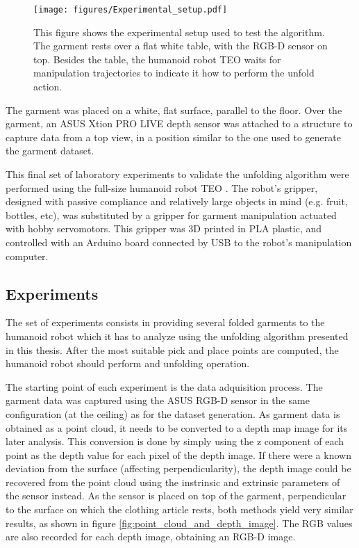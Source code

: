 \begin{figure}[htbp]
    \centering
    \texttt{[image: figures/Experimental\_setup.pdf]}
    \caption[Experimental setup used to test the algorithm]
    {This figure shows the experimental setup used to test the algorithm. The garment rests over a flat white table, with the RGB-D sensor on top. Besides the table, the humanoid robot TEO waits for manipulation trajectories to indicate it how to perform the unfold action.}
    \label{fig:experimental_setup}
\end{figure}

The garment was placed on a white, flat surface, parallel to the floor. Over the garment, an ASUS Xtion PRO LIVE depth sensor was attached to a structure to capture data from a top view, in a position similar to the one used to generate the garment dataset.

This final set of laboratory experiments to validate the unfolding algorithm were performed using the full-size humanoid robot TEO \cite{martinez2012teo}. The robot's gripper, designed with passive compliance and relatively large objects in mind (e.g. fruit, bottles, etc), was substituted by a gripper for garment manipulation actuated with hobby servomotors. This gripper was 3D printed in PLA plastic, and controlled with an Arduino board connected by USB to the robot's manipulation computer. 


\subsection{Experiments}
\label{experiments:experiments}
The set of experiments consists in providing several folded garments to the humanoid robot which it has to analyze using the unfolding algorithm presented in this thesis. After the most suitable pick and place points are computed, the humanoid robot should perform and unfolding operation.

The starting point of each experiment is the data adquisition process. The garment data was captured using the ASUS RGB-D sensor in the same configuration (at the ceiling) as for the dataset generation. As garment data is obtained as a point cloud, it needs to be converted to a depth map image for its later analysis. This conversion is done by simply using the z component of each point as the depth value for each pixel of the depth image. If there were a known deviation from the surface (affecting perpendicularity), the depth image could be recovered from the point cloud using the instrinsic and extrinsic parameters of the sensor instead. As the sensor is placed on top of the garment, perpendicular to the surface on which the clothing article rests, both methods yield very similar results, as shown in figure \ref{fig:point_cloud_and_depth_image}.
The RGB values are also recorded for each depth image, obtaining an RGB-D image.

